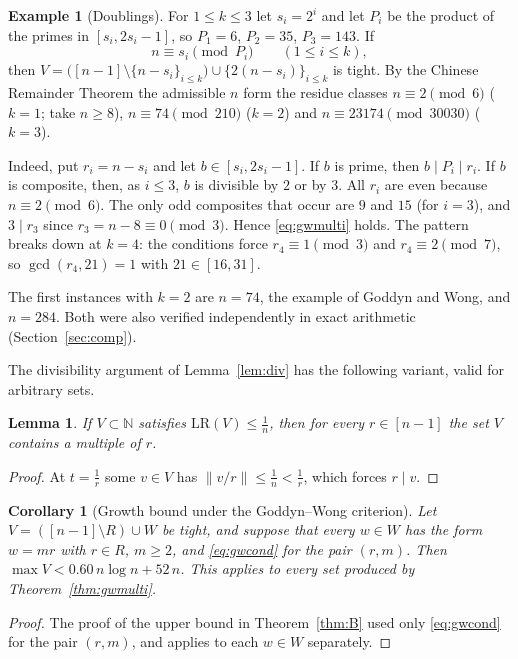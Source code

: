 \documentclass[11pt]{article}
\newtheorem{lemma}[theorem]{Lemma}
\newtheorem{corollary}[theorem]{Corollary}
\theoremstyle{definition}
\newtheorem{example}[theorem]{Example}
\newcommand{\LR}{\mathrm{LR}}
\newcommand{\N}{\mathbb{N}}
\newcommand{\norm}[1]{\left\lVert #1 \right\rVert}
\begin{document}
\begin{example}[Doublings]\label{ex:doubling}
For $1\le k\le3$ let $s_i=2^i$ and let $P_i$ be the product of the
primes in $[s_i,2s_i-1]$, so $P_1=6$, $P_2=35$, $P_3=143$. If
\[
n\equiv s_i\pmod{P_i}\qquad(1\le i\le k),
\]
then
$V=\bigl([n-1]\setminus\{n-s_i\}_{i\le k}\bigr)\cup\{2(n-s_i)\}_{i\le k}$
is tight. By the Chinese Remainder Theorem the admissible $n$ form the
residue classes $n\equiv2\pmod6$ ($k=1$; take $n\ge8$),
$n\equiv74\pmod{210}$ ($k=2$) and $n\equiv23174\pmod{30030}$ ($k=3$).

Indeed, put $r_i=n-s_i$ and let $b\in[s_i,2s_i-1]$. If $b$ is prime,
then $b\mid P_i\mid r_i$. If $b$ is composite, then, as $i\le3$, $b$ is
divisible by $2$ or by $3$. All $r_i$ are even because
$n\equiv2\pmod6$. The only odd composites that occur are $9$ and $15$
(for $i=3$), and $3\mid r_3$ since $r_3=n-8\equiv0\pmod3$. Hence
\eqref{eq:gwmulti} holds. The pattern breaks down at $k=4$: the
conditions force $r_4\equiv1\pmod3$ and $r_4\equiv2\pmod7$, so
$\gcd(r_4,21)=1$ with $21\in[16,31]$.
\end{example}

The first instances with $k=2$ are $n=74$, the example of Goddyn and
Wong, and $n=284$. Both were also verified independently in exact
arithmetic (Section~\ref{sec:comp}).

The divisibility argument of Lemma~\ref{lem:div} has the following
variant, valid for arbitrary sets.

\begin{lemma}\label{lem:multiples}
If $V\subset\N$ satisfies $\LR(V)\le\frac1n$, then for every
$r\in[n-1]$ the set $V$ contains a multiple of $r$.
\end{lemma}

\begin{proof}
At $t=\frac1r$ some $v\in V$ has $\norm{v/r}\le\frac1n<\frac1r$, which
forces $r\mid v$.
\end{proof}

\begin{corollary}[Growth bound under the Goddyn--Wong criterion]\label{thm:growth}
Let $V=([n-1]\setminus R)\cup W$ be tight, and suppose that every $w\in
W$ has the form $w=mr$ with $r\in R$, $m\ge2$, and \eqref{eq:gwcond}
for the pair $(r,m)$. Then $\max V<0.60\,n\log n+52\,n$. This applies to
every set produced by Theorem~\ref{thm:gwmulti}.
\end{corollary}

\begin{proof}
The proof of the upper bound in Theorem~\ref{thm:B} used only
\eqref{eq:gwcond} for the pair $(r,m)$, and applies to each $w\in W$
separately.
\end{proof}
\end{document}
